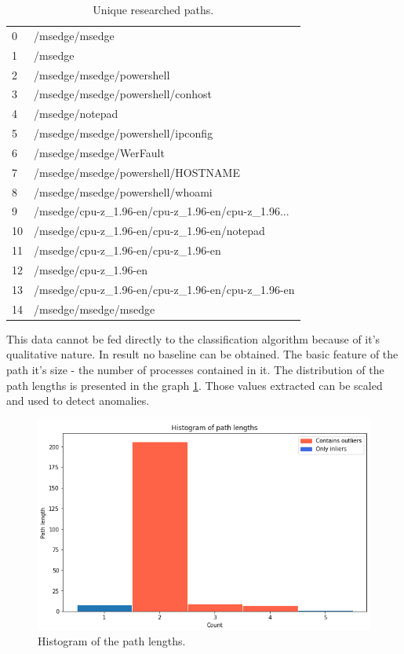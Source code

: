 \documentclass[a4paper,twoside,12pt]{book}
\begin{document}
\begin{table}
	\centering
	\caption{Unique researched paths.}
	\label{id:tab:uniqPaths}
	\begin{tabular}{ll}
		\toprule
		0  &                                     /msedge/msedge \\
		1  &                                            /msedge \\
		2  &                          /msedge/msedge/powershell \\
		3  &                  /msedge/msedge/powershell/conhost \\
		4  &                                    /msedge/notepad \\
		5  &                 /msedge/msedge/powershell/ipconfig \\
		6  &                            /msedge/msedge/WerFault \\
		7  &                 /msedge/msedge/powershell/HOSTNAME \\
		8  &                   /msedge/msedge/powershell/whoami \\
		9  &  /msedge/cpu-z\_1.96-en/cpu-z\_1.96-en/cpu-z\_1.96... \\
		10 &        /msedge/cpu-z\_1.96-en/cpu-z\_1.96-en/notepad \\
		11 &                /msedge/cpu-z\_1.96-en/cpu-z\_1.96-en \\
		12 &                              /msedge/cpu-z\_1.96-en \\
		13 &  /msedge/cpu-z\_1.96-en/cpu-z\_1.96-en/cpu-z\_1.96-en \\
		14 &                              /msedge/msedge/msedge \\
		\bottomrule
	\end{tabular}
\end{table}

This data cannot be fed directly to the classification algorithm because of it's 
qualitative nature. In result no baseline can be obtained. The basic feature
of the path it's size - the number of processes contained in it. The distribution
of the path lengths is presented in the graph \ref{fig:pathLenHist}. Those values
extracted can be scaled and used to detect anomalies.

\begin{figure}
	\centering
	\includegraphics[scale=0.9]{images/pathLenHist}
	\caption{Histogram of the path lengths.}
	\label{fig:pathLenHist}
 \end{figure}
\end{document}
